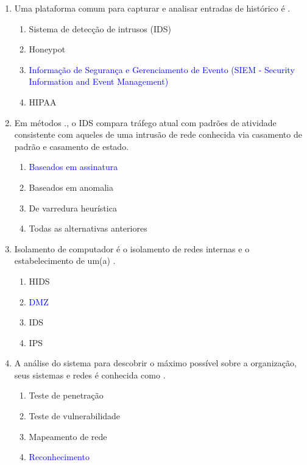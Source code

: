 \documentclass{report}
\begin{document}
\begin{enumerate}
		\item Uma plataforma comum para capturar e analisar entradas de histórico é .
		\begin{enumerate}[label=(\alph*)]
			\item Sistema de detecção de intrusos (IDS)
			\item Honeypot
			\item \textcolor{blue}{Informação de Segurança e Gerenciamento de Evento (SIEM - Security Information and Event Management)}
			\item HIPAA
		\end{enumerate}
		
		\item Em métodos ., o IDS compara tráfego atual com padrões de atividade consistente com aqueles de uma intrusão de rede conhecida via casamento de padrão e casamento de estado.
		\begin{enumerate}[label=(\alph*)]
			\item \textcolor{blue}{Baseados em assinatura}
			\item Baseados em anomalia
			\item De varredura heurística
			\item Todas as alternativas anteriores
		\end{enumerate}
		
		\item Isolamento de computador é o isolamento de redes internas e o estabelecimento de um(a) .
		\begin{enumerate}[label=(\alph*)]
			\item HIDS
			\item \textcolor{blue}{DMZ}
			\item IDS
			\item IPS
		\end{enumerate}
		
		\item A análise do sistema para descobrir o máximo possível sobre a organização, seus sistemas e redes é conhecida como .
		\begin{enumerate}[label=(\alph*)]
			\item Teste de penetração
			\item Teste de vulnerabilidade
			\item Mapeamento de rede
			\item \textcolor{blue}{Reconhecimento}
		\end{enumerate}
		
	\end{enumerate}
	
	
	
	
	
	
	
\end{document}
